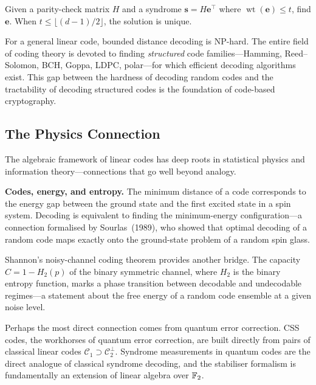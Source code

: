 \begin{definition}
\label{def:bdd}
Given a parity-check matrix $H$ and a syndrome $\mathbf{s} = H\mathbf{e}^\top$ where $\operatorname{wt}(\mathbf{e}) \leq t$, find $\mathbf{e}$.  When $t \leq \lfloor(d-1)/2\rfloor$, the solution is unique.
\end{definition}

For a general linear code, bounded distance decoding is NP-hard.  The entire field of coding theory is devoted to finding \emph{structured} code families---Hamming, Reed--Solomon, BCH, Goppa, LDPC, polar---for which efficient decoding algorithms exist.  This gap between the hardness of decoding random codes and the tractability of decoding structured codes is the foundation of code-based cryptography.


\subsection{The Physics Connection}
\label{subsec:ecc-physics}

The algebraic framework of linear codes has deep roots in statistical physics and information theory---connections that go well beyond analogy.

\begin{svgraybox}
\textbf{Codes, energy, and entropy.}
The minimum distance of a code corresponds to the energy gap between the ground state and the first excited state in a spin system.  Decoding is equivalent to finding the minimum-energy configuration---a connection formalised by Sourlas~(1989), who showed that optimal decoding of a random code maps exactly onto the ground-state problem of a random spin glass.

Shannon's noisy-channel coding theorem provides another bridge.  The capacity $C = 1 - H_2(p)$ of the binary symmetric channel, where $H_2$ is the binary entropy function, marks a phase transition between decodable and undecodable regimes---a statement about the free energy of a random code ensemble at a given noise level.

Perhaps the most direct connection comes from quantum error correction.  CSS codes, the workhorses of quantum error correction, are built directly from pairs of classical linear codes $\mathcal{C}_1 \supset \mathcal{C}_2^\perp$.  Syndrome measurements in quantum codes are the direct analogue of classical syndrome decoding, and the stabiliser formalism is fundamentally an extension of linear algebra over $\mathbb{F}_2$.
\end{svgraybox}


